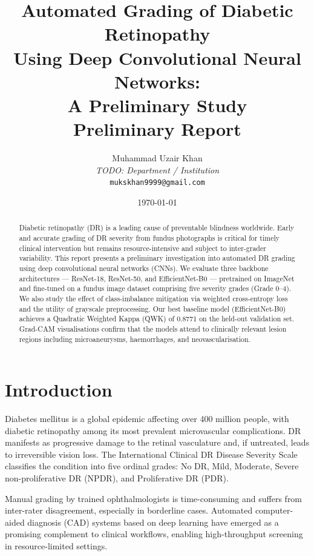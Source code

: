 \documentclass[12pt, a4paper]{article}
\title{
    \Large\textbf{Automated Grading of Diabetic Retinopathy\\
    Using Deep Convolutional Neural Networks:\\
    A Preliminary Study}\\[1em]
    \normalsize Preliminary Report
}
\author{
    Muhammad Uzair Khan\\
    \small\textit{TODO: Department / Institution}\\
    \small\texttt{mukskhan9999@gmail.com}
}
\date{\today}
\begin{document}
\maketitle
\tableofcontents
\newpage

\begin{abstract}
Diabetic retinopathy (DR) is a leading cause of preventable blindness worldwide.
Early and accurate grading of DR severity from fundus photographs is critical for
timely clinical intervention but remains resource-intensive and subject to
inter-grader variability.
This report presents a preliminary investigation into automated DR grading using
deep convolutional neural networks (CNNs).
We evaluate three backbone architectures --- ResNet-18, ResNet-50, and EfficientNet-B0
--- pretrained on ImageNet and fine-tuned on a fundus image dataset comprising five
severity grades (Grade 0--4).
We also study the effect of class-imbalance mitigation via weighted cross-entropy
loss and the utility of grayscale preprocessing.
Our best baseline model (EfficientNet-B0) achieves a Quadratic Weighted Kappa (QWK)
of 0.8771 on the held-out validation set.
Grad-CAM visualisations confirm that the models attend to clinically relevant
lesion regions including microaneurysms, haemorrhages, and neovascularisation.
\end{abstract}

\section{Introduction}
\label{sec:intro}

Diabetes mellitus is a global epidemic affecting over 400 million people, with
diabetic retinopathy among its most prevalent microvascular complications.
DR manifests as progressive damage to the retinal vasculature and, if untreated,
leads to irreversible vision loss.
The International Clinical DR Disease Severity Scale classifies the condition into
five ordinal grades: No DR, Mild, Moderate, Severe non-proliferative DR (NPDR), and
Proliferative DR (PDR).

Manual grading by trained ophthalmologists is time-consuming and suffers from
inter-rater disagreement, especially in borderline cases.
Automated computer-aided diagnosis (CAD) systems based on deep learning have emerged
as a promising complement to clinical workflows, enabling high-throughput screening
in resource-limited settings.
\end{document}
